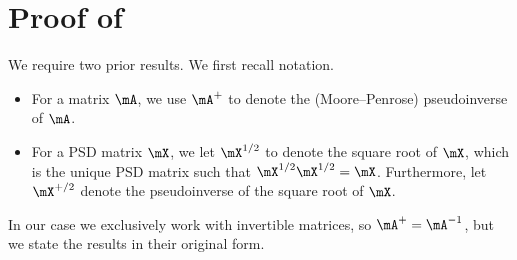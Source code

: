 \section{Proof of }\label{sec:goodF}
We require two prior results. We first recall notation.
\begin{itemize}
    \item For a matrix $\mA$, we use $\mA^+$ to denote the (Moore--Penrose) %
    pseudoinverse of $\mA$.  %
    \item For a PSD matrix $\mX$, we let $\mX^{1/2}$ to denote the square root of $\mX$, which is the unique PSD matrix such that $\mX^{1/2}\mX^{1/2}=\mX$. Furthermore, let $\mX^{+/2}$ denote the pseudoinverse  %
    of the square root of $\mX$.
\end{itemize}
In our case we exclusively work with invertible matrices, so $\mA^+=\mA^{-1}$, but we
state the results in their original %
form.  %
  
